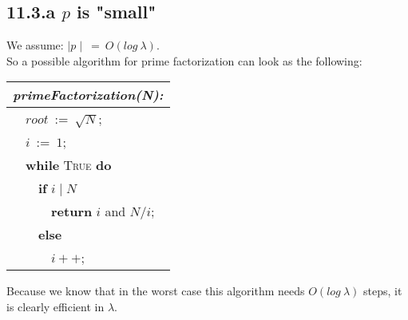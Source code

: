 \documentclass{report}
\begin{document}
	\subsection*{11.3.a $p$ is "small"}
	We assume: $\mid p \mid \ = \ O(log \ \lambda)$. \\
	So a possible algorithm for prime factorization can look as the following:
	\begin{center}	
		\begin{tabular}{|l|}
			\hline
			\cellcolor{gray!80} \textbf{\textit{primeFactorization(N):}} \\
			\hline
			\ \ $root \ := \ \sqrt{N}$; \\
			\ \ $i \ := \ 1$; \\
			\ \ \textbf{while} \textsc{True} \textbf{do} \\
			\ \ \ \ \textbf{if} $i \mid N$ \\
			\ \ \ \ \ \ \textbf{return} $i$ and $N/i$; \\
			\ \ \ \ \textbf{else} \\
			\ \ \ \ \ \ $i++$; \\
			\hline
		\end{tabular}
	\end{center}
	Because we know that in the worst case this algorithm needs $O(log \ \lambda)$ steps, it is clearly efficient in $\lambda$.
\end{document}
